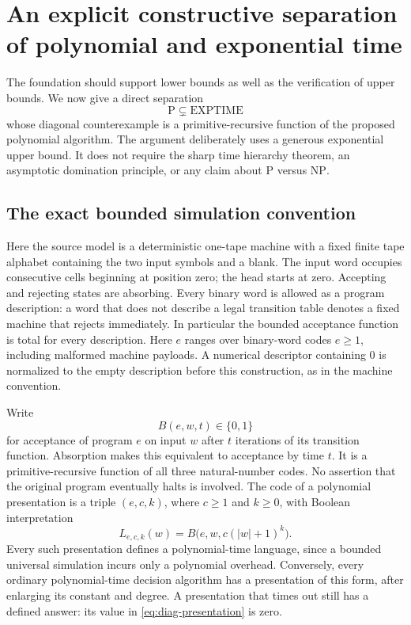 \section{An explicit constructive separation of polynomial and exponential time}
\label{sec:diagonal}

The foundation should support lower bounds as well as the verification of
upper bounds.  We now give a direct separation
\[
  \mathrm{P}\subsetneq\mathrm{EXPTIME}
\]
whose diagonal counterexample is a primitive-recursive function of the
proposed polynomial algorithm.  The argument deliberately uses a generous
exponential upper bound.  It does not require the sharp time hierarchy theorem,
an asymptotic domination principle, or any claim about
\(\mathrm{P}\) versus \(\mathrm{NP}\).

\subsection{The exact bounded simulation convention}

Here the source model is a deterministic one-tape machine with a fixed finite
tape alphabet containing the two input symbols and a blank.  The input word
occupies consecutive cells beginning at position zero; the head starts at
zero.  Accepting and rejecting states are absorbing.  Every binary word is
allowed as a program description: a word that does not describe a legal
transition table denotes a fixed machine that rejects immediately.  In
particular the bounded acceptance function is total for every description.
Here \(e\) ranges over binary-word codes \(e\ge1\), including malformed
machine payloads. A numerical descriptor containing 0 is normalized to
the empty description before this construction, as in the machine convention.

Write
\[
  B(e,w,t)\in\{0,1\}
\]
for acceptance of program \(e\) on input \(w\) after \(t\) iterations of its
transition function.  Absorption makes this equivalent to acceptance by time
\(t\).  It is a primitive-recursive function of all three natural-number
codes.  No assertion that the original program eventually halts is involved.
The code of a polynomial presentation is a triple \((e,c,k)\), where
\(c\geq 1\) and \(k\geq0\), with Boolean interpretation
\begin{equation}
  L_{e,c,k}(w)=B\bigl(e,w,c(|w|+1)^k\bigr).
  \label{eq:diag-presentation}
\end{equation}
Every such presentation defines a polynomial-time language, since a bounded
universal simulation incurs only a polynomial overhead.  Conversely, every
ordinary polynomial-time decision algorithm has a presentation of this form,
after enlarging its constant and degree.  A presentation that times out still
has a defined answer: its value in \eqref{eq:diag-presentation} is zero.

